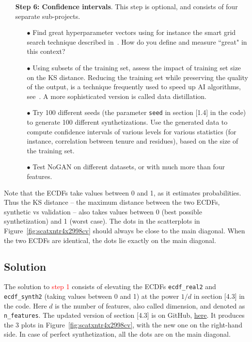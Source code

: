 \documentclass[oneside,10pt]{book}
\begin{document}
\begin{itemize}
\item[]{\bf Step 6: Confidence intervals}. This step is optional, and consists of four separate sub-projects. 
\vspace{1ex}
\begin{itemize}
\item[$\bullet$] Find great hyperparameter vectors using for instance 
 the \textcolor{index}{smart grid search} technique described in~\cite{vgsmart}. How do you define and measure ``great" in this context?
\item[$\bullet$] Using subsets of the training set, assess the impact 
 of training set size on the KS distance. Reducing the training set while preserving the quality of the output, is a technique
 frequently used to speed up AI algorithms, see~\cite{vgthin}.  A more sophisticated version
 is called \textcolor{index}{data distillation}.
\item[$\bullet$] Try 100 different seeds (the parameter \texttt{seed} in section [1.4] in the code) to generate 100 different synthetizations. Use the generated data to compute confidence intervals of various levels for various statistics (for instance, correlation  between tenure and residues), based on the size of the training set.
\item[$\bullet$] Test NoGAN on different datasets, or with much more than four features.
\end{itemize}

\vspace{1ex}


\end{itemize}\vspace{1ex}

\noindent Note that the ECDFs take values between 0 and 1, as it estimates probabilities. Thus the KS distance -- the maximum distance between the two ECDFs, synthetic vs validation -- also takes values between 0 (best possible synthetization) and 1 (worst case). The dots in the scatterplots in Figure~\ref{fig:scatxntr4x2998cv}
 should always be close to the main diagonal. When the two ECDFs are identical, the dots lie exactly on the main diagonal.


\subsection{Solution}

The solution to \textcolor{red}{step 1} consists of elevating the ECDFs \texttt{ecdf\_real2} and \texttt{ecdf\_synth2}
 (taking values between 0 and 1) at the power $1/d$
in section [4.3] in the code. Here $d$ is the number of features, also called dimension, and denoted
 as \texttt{n\_features}. The updated version of section [4.3] is on GitHub, \href{https://github.com/VincentGranville/Main/blob/main/NoGAN_ecdf_scatter.py}{here}. It produces the 3 plots in Figure~\ref{fig:scatxntr4x2998cv}, with the new one on the right-hand side. In case of perfect synthetization,
 all the dots are on the main diagonal.
\end{document}
